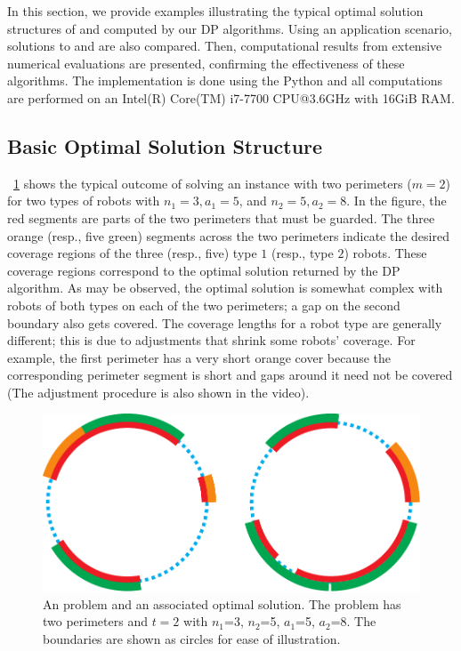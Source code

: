 In this section, we provide examples illustrating the typical 
optimal solution structures of \opglr and \opgmc computed by 
our DP algorithms. Using an application scenario, solutions to 
\opglr and \opgmc are also compared. Then, computational 
results from extensive numerical evaluations are presented, 
confirming the effectiveness of these algorithms. The 
implementation is done using the Python and all 
computations are performed on an Intel(R) Core(TM) i7-7700 CPU@3.6GHz 
with 16GiB RAM. 

\subsection{Basic Optimal Solution Structure}
~\ref{fig:opgext-opglrm} shows the typical outcome of solving an \opglr 
instance with two perimeters ($m = 2$) for two types of robots with 
$n_1 = 3, a_1 = 5$, and $n_2 = 5, a_2 = 8$. 
In the figure, the red segments are parts of the two perimeters that 
must be guarded. The three orange (resp., five green) segments across 
the two perimeters indicate the desired coverage regions of the three 
(resp., five) type $1$ (resp., type $2$) robots. These coverage regions 
correspond to the optimal solution returned by the DP algorithm. As 
may be observed, the optimal solution is somewhat complex with robots 
of both types on each of the two perimeters; a gap on the second boundary 
also gets covered. The coverage lengths for a robot type are generally 
different; this is due to adjustments that shrink some robots' coverage. 
For example, the first perimeter has a very short orange cover because 
the corresponding perimeter segment is short and gaps around it need 
not be covered (The adjustment procedure is also shown in the video). 
\begin{figure}[!ht]
    \centering
    \includegraphics[scale = 0.6]{chapters/opg-ext/figures/mopglr_shrink-new-eps-converted-to.pdf}
    \caption{An \opglr problem and an associated optimal solution. The 
		problem has two perimeters and $t = 2$ with $n_1$=3, $n_2$=5, 
		$a_1$=5, $a_2$=8. The boundaries are shown as circles for ease of 
		illustration.
		}
		\label{fig:opgext-opglrm}
\end{figure}

